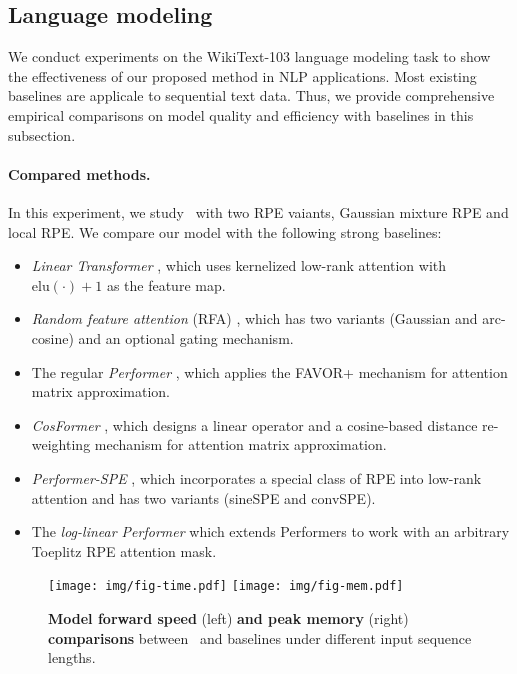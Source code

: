 \subsection{Language modeling}
\label{sec:lm}

We conduct experiments on the WikiText-103 language modeling task to show the effectiveness of our proposed method in NLP applications. Most existing baselines are applicale to sequential text data. Thus, we provide comprehensive empirical comparisons on model quality and efficiency with baselines in this subsection.

\paragraph{Compared methods.}
In this experiment, we study \FLT~with two RPE vaiants, Gaussian mixture RPE and local RPE. We compare our model with the following strong baselines:

\begin{itemize} 
\item \textit{Linear Transformer} \cite{katharopoulos2020transformers}, which uses kernelized low-rank attention with $\mathrm{elu}(\cdot)+1$ as the feature map. 
\item  \textit{Random feature attention} (RFA) {\small \cite{peng2021random}}, which has two variants (Gaussian and arc-cosine) and an optional gating mechanism. 
\item  The regular \textit{Performer} \cite{choromanski}, which applies the FAVOR+ mechanism for attention matrix approximation. 
\item  \textit{CosFormer} \cite{cosformer}, which designs a linear operator and a cosine-based distance re-weighting mechanism for attention matrix approximation. 
\item \textit{Performer-SPE} \cite{liutkus}, which incorporates a special class of RPE into low-rank attention and has two variants (sineSPE and convSPE). 
\item  The \textit{log-linear Performer} \cite{rpe-performers} which extends Performers to work with an arbitrary Toeplitz RPE attention mask.
\end{itemize}

\begin{figure*}[!t]
    \centering
    \texttt{[image: img/fig-time.pdf]}
    \texttt{[image: img/fig-mem.pdf]}
    \vspace{-4mm}  
    \caption{\textbf{Model forward speed} (left) \textbf{and peak memory} (right) \textbf{comparisons} between \FLT~and baselines under different input sequence lengths.}
    \vspace{-3mm}
    \label{fig:efficiency}
\end{figure*}

